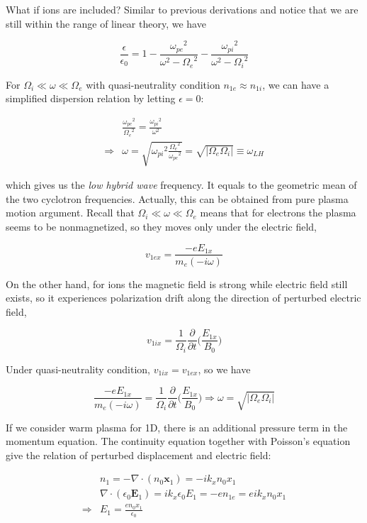 \documentclass[
  notoc %
]{tufte-book}
\begin{document}
What if ions are included? Similar to previous derivations and notice
that we are still within the range of linear theory, we have

\[
\frac{\epsilon}{\epsilon_0}=1-\frac{{\omega_{pe}}^2}{\omega^2-{\Omega_e}^2}-\frac{{\omega_{pi}}^2}{\omega^2-{\Omega_i}^2}
\]

For \(\Omega_i\ll \omega\ll \Omega_e\) with quasi-neutrality condition
\(n_{1e}\approx n_{1i}\), we can have a simplified dispersion relation
by letting \(\epsilon=0\):

\[
\begin{aligned}
&\frac{{\omega_{pe}}^2}{{\Omega_{e}}^2}=\frac{{\omega_{pi}}^2}{\omega^2}\\
\Rightarrow& \omega=\sqrt{{\omega_{pi}}^2\frac{{\Omega_e}^2}{{\omega_{pe}}^2}}=\sqrt{|\Omega_e \Omega_i|}\equiv \omega_{LH}
\end{aligned}
\]

which gives us the \emph{low hybrid wave} frequency. It equals to the
geometric mean of the two cyclotron frequencies. Actually, this can be
obtained from pure plasma motion argument. Recall that
\(\Omega_i \ll \omega \ll \Omega_e\) means that for electrons the plasma
seems to be nonmagnetized, so they moves only under the electric field,

\[
v_{1ex}=\frac{-eE_{1x}}{m_e(-i\omega)}
\]

On the other hand, for ions the magnetic field is strong while electric
field still exists, so it experiences polarization drift along the
direction of perturbed electric field,

\[
v_{1ix}=\frac{1}{\Omega_i}\frac{\partial}{\partial t}\Big( \frac{E_{1x}}{B_0}\Big)
\]

Under quasi-neutrality condition, \(v_{1ix}=v_{1ex}\), so we have

\[
\frac{-eE_{1x}}{m_e(-i\omega)}=\frac{1}{\Omega_i}\frac{\partial}{\partial t}\Big( \frac{E_{1x}}{B_0}\Big) \Rightarrow \omega=\sqrt{|\Omega_e \Omega_i|}
\]

If we consider warm plasma for 1D, there is an additional pressure term
in the momentum equation. The continuity equation together with
Poisson's equation give the relation of perturbed displacement and
electric field:

\[
\begin{aligned}
&n_1=-\nabla\cdot(n_0\mathbf{x}_1)=-ik_xn_0x_1 \\
&\nabla\cdot(\epsilon_0\mathbf{E}_1)=ik_x\epsilon_0E_{1}=-en_{1e}=eik_xn_0x_1 \\
\Rightarrow& E_{1}=\frac{en_0x_1}{\epsilon_0}
\end{aligned}
\]
\end{document}
